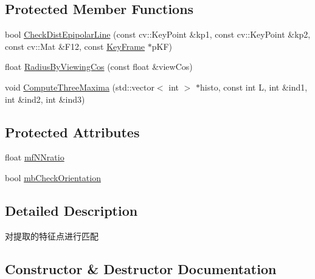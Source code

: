 \subsection*{Protected Member Functions}
\begin{DoxyCompactItemize}
\item 
bool \mbox{\hyperlink{class_o_r_b___s_l_a_m2_1_1_o_r_bmatcher_a10df000eeb05466a5bbfd7b40c7db45d}{Check\+Dist\+Epipolar\+Line}} (const cv\+::\+Key\+Point \&kp1, const cv\+::\+Key\+Point \&kp2, const cv\+::\+Mat \&F12, const \mbox{\hyperlink{class_o_r_b___s_l_a_m2_1_1_key_frame}{Key\+Frame}} $\ast$p\+KF)
\item 
float \mbox{\hyperlink{class_o_r_b___s_l_a_m2_1_1_o_r_bmatcher_ae6ae0904b9919f1141ef4a790cd34bfe}{Radius\+By\+Viewing\+Cos}} (const float \&view\+Cos)
\item 
void \mbox{\hyperlink{class_o_r_b___s_l_a_m2_1_1_o_r_bmatcher_ad6613e26706798c507b5266cdd101311}{Compute\+Three\+Maxima}} (std\+::vector$<$ int $>$ $\ast$histo, const int L, int \&ind1, int \&ind2, int \&ind3)
\end{DoxyCompactItemize}
\subsection*{Protected Attributes}
\begin{DoxyCompactItemize}
\item 
float \mbox{\hyperlink{class_o_r_b___s_l_a_m2_1_1_o_r_bmatcher_a08f6ee66568fa5a79600ed5ad8443893}{mf\+N\+Nratio}}
\item 
bool \mbox{\hyperlink{class_o_r_b___s_l_a_m2_1_1_o_r_bmatcher_a996a27217749aa15d2210c6dc6228495}{mb\+Check\+Orientation}}
\end{DoxyCompactItemize}


\subsection{Detailed Description}
对提取的特征点进行匹配 

\subsection{Constructor \& Destructor Documentation}
\mbox{\label{class_o_r_b___s_l_a_m2_1_1_o_r_bmatcher_a6ca536b80e44da0f56fcd35ff8c6a833}} 
